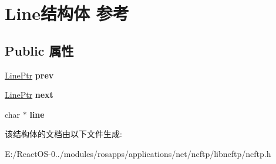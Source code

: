 \hypertarget{struct_line}{}\section{Line结构体 参考}
\label{struct_line}
\subsection*{Public 属性}
\begin{DoxyCompactItemize}
\item 
\mbox{\label{struct_line_a24fb07bc3383e4ff938ad928b95b4a6c}} 
\hyperlink{struct_line}{Line\+Ptr} {\bfseries prev}
\item 
\mbox{\label{struct_line_a6adb214511fb7e5e525fde9af81d180f}} 
\hyperlink{struct_line}{Line\+Ptr} {\bfseries next}
\item 
\mbox{\label{struct_line_a31859492460344201e55cdc3c7cf7cc8}} 
char $\ast$ {\bfseries line}
\end{DoxyCompactItemize}


该结构体的文档由以下文件生成\+:\begin{DoxyCompactItemize}
\item 
E\+:/\+React\+O\+S-\/0../modules/rosapps/applications/net/ncftp/libncftp/ncftp.\+h\end{DoxyCompactItemize}
